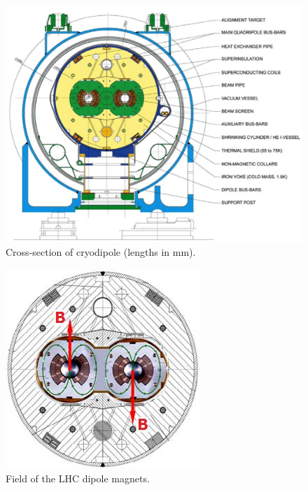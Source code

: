 		\begin{figure}[!ht]
		\centering
		\includegraphics[width=\textwidth,keepaspectratio=true]{chapters/chapter2_experiment/images/dipole-crosssection.png}
		\caption{Cross-section of cryodipole (lengths in mm). \cite{lhc-machine}}
		\label{fig:dipole-xsec}
		\end{figure}

		\begin{figure}[!ht]
		\centering
		\includegraphics[width=.45\textwidth,keepaspectratio=true]{chapters/chapter2_experiment/images/dipole-field.jpeg}
		\caption{Field of the LHC dipole magnets. \cite{dipole-field}}
		\label{fig:dipole-field}
		\end{figure}

